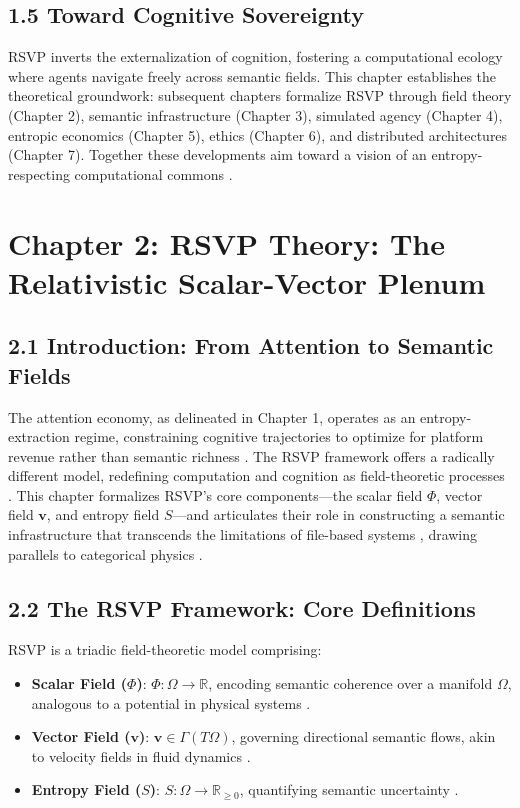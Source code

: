 \documentclass[12pt]{article}
\begin{document}
\subsection{1.5 Toward Cognitive Sovereignty}

RSVP inverts the externalization of cognition, fostering a computational ecology where agents navigate freely across semantic fields. This chapter establishes the theoretical groundwork: subsequent chapters formalize RSVP through field theory (Chapter 2), semantic infrastructure (Chapter 3), simulated agency (Chapter 4), entropic economics (Chapter 5), ethics (Chapter 6), and distributed architectures (Chapter 7). Together these developments aim toward a vision of an entropy-respecting computational commons \citep{atiyah1969, milewski2018}.

\section{Chapter 2: RSVP Theory: The Relativistic Scalar-Vector Plenum}

\subsection{2.1 Introduction: From Attention to Semantic Fields}

The attention economy, as delineated in Chapter 1, operates as an entropy-extraction regime, constraining cognitive trajectories to optimize for platform revenue rather than semantic richness \citep{zuboff2019, lanier2018}. The RSVP framework offers a radically different model, redefining computation and cognition as field-theoretic processes \citep{gromov1999}. This chapter formalizes RSVP’s core components—the scalar field \(\Phi\), vector field \(\mathbf{v}\), and entropy field \(S\)—and articulates their role in constructing a semantic infrastructure that transcends the limitations of file-based systems \citep{bird1988}, drawing parallels to categorical physics \citep{baez2011}.

\subsection{2.2 The RSVP Framework: Core Definitions}

RSVP is a triadic field-theoretic model comprising:
\begin{itemize}
    \item \textbf{Scalar Field (\(\Phi\))}: \(\Phi: \Omega \to \mathbb{R}\), encoding semantic coherence over a manifold \(\Omega\), analogous to a potential in physical systems \citep{gromov1999}.
    \item \textbf{Vector Field (\(\mathbf{v}\))}: \(\mathbf{v} \in \Gamma(T\Omega)\), governing directional semantic flows, akin to velocity fields in fluid dynamics \citep{baez2011}.
    \item \textbf{Entropy Field (\(S\))}: \(S: \Omega \to \mathbb{R}_{\geq 0}\), quantifying semantic uncertainty \citep{shannon1948}.
\end{itemize}
\end{document}
